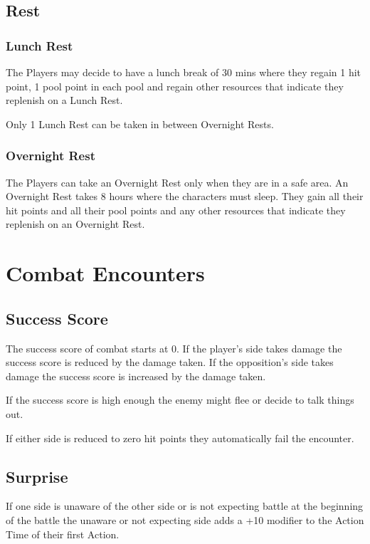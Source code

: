 \documentclass[a4paper,12pt,oneside]{book}
\begin{document}
            \subsection{Rest}
                \subsubsection{Lunch Rest}
                    The Players may decide to have a lunch break of 30 mins where they regain 1 hit point, 1 pool point in each pool and regain other resources that indicate they replenish on a Lunch Rest.

                    Only 1 Lunch Rest can be taken in between Overnight Rests.
                \subsubsection{Overnight Rest}
                    The Players can take an Overnight Rest only when they are in a safe area. An Overnight Rest takes 8 hours where the characters must sleep. They gain all their hit points and all their pool points and any other resources that indicate they replenish on an Overnight Rest.
        
        \section{Combat Encounters}
            \subsection{Success Score}
                The success score of combat starts at 0. If the player's side takes damage the success score is reduced by the damage taken. If the opposition's side takes damage the success score is increased by the damage taken.

                If the success score is high enough the enemy might flee or decide to talk things out.

                If either side is reduced to zero hit points they automatically fail the encounter.

            \subsection{Surprise}
                If one side is unaware of the other side or is not expecting battle at the beginning of the battle the unaware or not expecting side adds a +10 modifier to the Action Time of their first Action.
\end{document}
